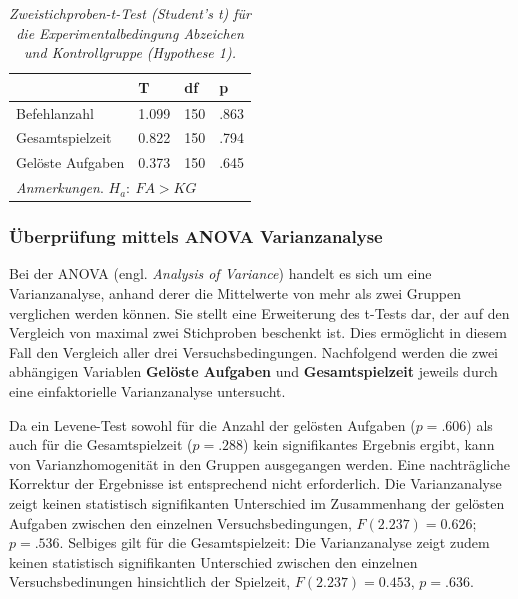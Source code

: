 \begin{table}[htbp]
\centering
\caption{\textit{Zweistichproben-t-Test (Student's t) für die Experimentalbedingung Abzeichen und Kontrollgruppe (Hypothese 1).}}
\begin{tabular}{  p{4cm} p{2.0cm} p{2.0cm} p{2.0cm}  }
 \hline
 & T &df & p \\
 \hline
  Befehlanzahl       & 1.099   &   150 & .863\\
  Gesamtspielzeit    & 0.822   &   150 & .794\\
  Gelöste Aufgaben   & 0.373   &   150 & .645\\
 \hline
 \multicolumn{4}{l}{%
 \small%
\textit{Anmerkungen}. $H_a:\: FA > KG$
}\\
\end{tabular}
\label{ttest_hypo_2}
\end{table}





\subsubsection{Überprüfung mittels ANOVA Varianzanalyse }
Bei der ANOVA (engl. \textit{Analysis of Variance}) handelt es sich um eine Varianzanalyse, anhand derer die Mittelwerte von mehr als zwei Gruppen verglichen werden können. Sie stellt eine Erweiterung des t-Tests dar, der auf den Vergleich von maximal zwei Stichproben beschenkt ist. Dies ermöglicht in diesem Fall den Vergleich aller drei Versuchsbedingungen. Nachfolgend werden die zwei abhängigen Variablen \textbf{Gelöste Aufgaben} und \textbf{Gesamtspielzeit} jeweils durch eine einfaktorielle Varianzanalyse untersucht.

Da ein Levene-Test sowohl für die Anzahl der gelösten Aufgaben ($p = .606$) als auch für die Gesamtspielzeit ($p = .288$) kein signifikantes Ergebnis ergibt, kann von Varianzhomogenität in den Gruppen ausgegangen werden. Eine nachträgliche Korrektur der Ergebnisse ist entsprechend nicht erforderlich. Die Varianzanalyse zeigt keinen statistisch signifikanten Unterschied im Zusammenhang der gelösten Aufgaben zwischen den einzelnen Versuchsbedingungen, $F (2.237) = 0.626$; $p = .536$. Selbiges gilt für die Gesamtspielzeit: Die Varianzanalyse zeigt zudem keinen statistisch  signifikanten Unterschied zwischen den einzelnen Versuchsbedinungen hinsichtlich der Spielzeit,  $F(2.237) = 0.453$, $p = .636$.


